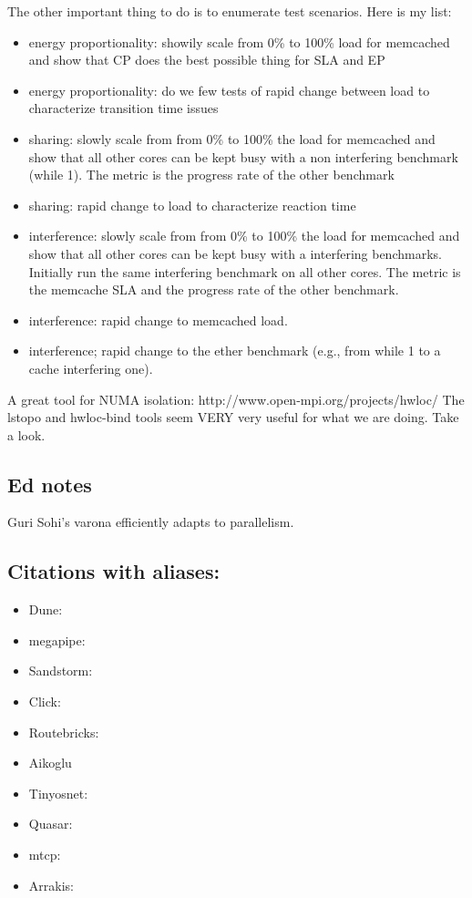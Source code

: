 The other important thing to do is to enumerate test scenarios. Here is my list:
\begin{itemize}

\item energy proportionality: showily scale from 0\% to 100\% load for
  memcached and show that CP does the best possible thing for SLA and
  EP

\item energy proportionality: do we few tests of rapid change between load to characterize transition time issues
\item  sharing: slowly scale from from 0\% to 100\% the load for memcached and show that all other cores can be kept busy with a non interfering benchmark (while 1). The metric is the progress rate of the other benchmark

\item sharing: rapid change to load to characterize reaction time

\item interference: slowly scale from from 0\% to 100\% the load for memcached and show that all other cores can be kept busy with a interfering benchmarks. Initially run the same interfering benchmark on all other cores. The metric is the memcache SLA and the progress rate of the other benchmark. 

\item interference: rapid change to memcached load. 
\item interference; rapid change to the ether benchmark (e.g., from while 1 to a cache interfering one). 
\end{itemize}


A great tool for NUMA isolation: 
http://www.open-mpi.org/projects/hwloc/
The lstopo and hwloc-bind tools seem VERY very useful for what we are doing. Take a look. 


\subsection{Ed notes}

Guri Sohi's varona\cite{DBLP:conf/pldi/SridharanGS14} efficiently adapts to parallelism.


\subsection{Citations with aliases:}


\begin{itemize}
\item Dune: \cite{dune}
\item megapipe: \cite{megapipe}
\item Sandstorm: \cite{sandstorm}
\item Click: \cite{click}
\item Routebricks: \cite{routebricks}
\item Aikoglu \cite{Atikoglu:2012:WAL}
\item Tinyosnet: \cite{tinyosnet}
\item Quasar: \cite{quasar}
\item mtcp: \cite{mtcp}
\item Arrakis: \cite{arrakis-osdi}
\end{itemize}

